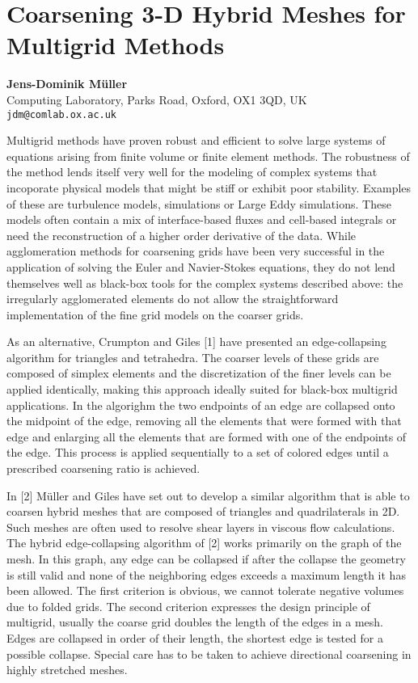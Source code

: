 \documentclass[11pt]{article}
\newcommand{\nextab}[4]{
	\section{#2}
	{\bf #1} \\ \nopagebreak
	{#3} \\ \nopagebreak
	{\tt #4} \nopagebreak
	}
\begin{document}

\nextab{Jens-Dominik M\"uller}
	{Coarsening 3-D Hybrid Meshes for Multigrid Methods}
	{Computing Laboratory, Parks Road, Oxford, OX1 3QD, UK}
	{jdm@comlab.ox.ac.uk}

Multigrid methods have proven robust and efficient to solve large
systems of equations arising from finite volume or finite element
methods. The robustness of the method lends itself very well for the
modeling of complex systems that incoporate physical models that might
be stiff or exhibit poor stability.  Examples of these are turbulence
models, simulations or Large Eddy simulations.  These models often
contain a mix of interface-based fluxes and cell-based integrals or
need the reconstruction of a higher order derivative of the data.
While agglomeration methods for coarsening grids have been very
successful in the application of solving the Euler and Navier-Stokes
equations, they do not lend themselves well as black-box tools for the
complex systems described above: the irregularly agglomerated
elements do not allow the straightforward implementation of the
fine grid models on the coarser grids.

As an alternative, Crumpton and Giles [1] have presented an
edge-collapsing algorithm for triangles and tetrahedra. The coarser
levels of these grids are composed of simplex elements and the
discretization of the finer levels can be applied identically, making
this approach ideally suited for black-box multigrid applications.
In the algorighm
the two endpoints of an edge are collapsed onto the midpoint of the
edge, removing all the elements that were formed with that edge and
enlarging all the elements that are formed with one of the endpoints
of the edge. This process is applied sequentially to a set of
colored edges until a prescribed coarsening ratio is achieved.

In [2] M\"uller and Giles have set out to develop a
similar algorithm that is able to coarsen hybrid meshes that are
composed of triangles and quadrilaterals in 2D.  Such meshes are often
used to resolve shear layers in viscous flow calculations.  The hybrid
edge-collapsing algorithm of [2] works primarily on the graph of the
mesh. In this graph, any edge can be collapsed if after the collapse
the geometry is still valid and none of the neighboring edges exceeds
a maximum length it has been allowed.  The first criterion is obvious,
we cannot tolerate negative volumes due to folded grids. The second
criterion expresses the design principle of multigrid, usually the
coarse grid doubles the length of the edges in a mesh. Edges are
collapsed in order of their length, the shortest edge is tested for a
possible collapse.  Special care has to be taken to achieve
directional coarsening in highly stretched meshes.
\end{document}
